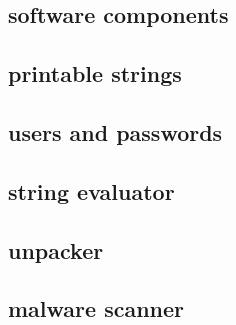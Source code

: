 \documentclass{article}
\begin{document}
\subsection{software components}


\subsection{printable strings}


\subsection{users and passwords}


\subsection{string evaluator}


\subsection{unpacker}


\subsection{malware scanner}

\end{document}
